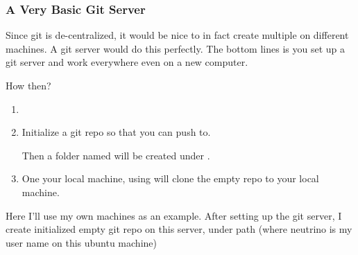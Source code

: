 \documentclass[letterpaper,12pt,english]{sphinxmanual}
\begin{document}
\subsubsection{A Very Basic Git Server}
\label{\detokenize{tools/git:a-very-basic-git-server}}
Since git is de-centralized, it would be nice to in fact create multiple  on different machines. A git server would do this perfectly. The bottom lines is you set up a git server and work everywhere even on a new computer.

How then?
\begin{enumerate}
\item {} 

\item {} 
Initialize a git repo  so that you can push to.

\begin{sphinxVerbatim}[commandchars=\\\{\}]
         
   
\end{sphinxVerbatim}

Then a folder named  will be created under .

\item {} 
One your local machine, using  will clone the empty repo to your local machine.

\end{enumerate}

Here I'll use my own machines as an example. After setting up the git server, I create initialized empty git repo on this server, under path  (where neutrino is my user name on this ubuntu machine)

\begin{sphinxVerbatim}[commandchars=\\\{\}]
   
\end{sphinxVerbatim}
\end{document}
